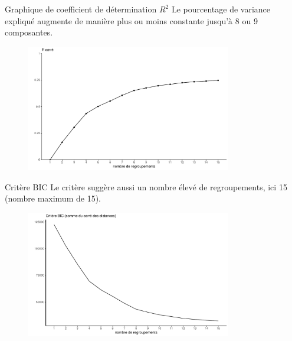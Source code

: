 \documentclass[
  ignorenonframetext,
]{beamer}
\begin{document}
\begin{frame}{Graphique de coefficient de détermination \(R^2\)}
\protect\hypertarget{graphique-de-coefficient-de-duxe9termination-r2}{}
Le pourcentage de variance expliqué augmente de manière plus ou moins
constante jusqu'à 8 ou 9 composantes.

\begin{figure}

{\centering \includegraphics[width=0.8\textwidth,height=\textheight]{MATH60602-diapos11_files/figure-beamer/unnamed-chunk-16-1.pdf}

}

\end{figure}
\end{frame}

\begin{frame}{Critère BIC}
\protect\hypertarget{crituxe8re-bic}{}
Le critère suggère aussi un nombre élevé de regroupements, ici 15
(nombre maximum de 15).

\begin{figure}

{\centering \includegraphics[width=0.8\textwidth,height=\textheight]{MATH60602-diapos11_files/figure-beamer/unnamed-chunk-17-1.pdf}

}

\end{figure}
\end{frame}
\end{document}
